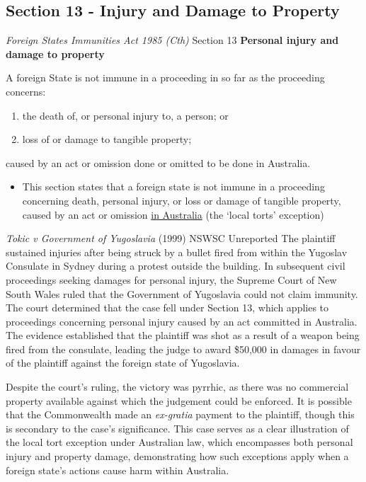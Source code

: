 \subsection{Section 13 - Injury and Damage to Property}
\begin{statutedetails}{\textit{Foreign States Immunities Act 1985 (Cth)} Section 13}
    \flushleft
    \textbf{Personal injury and damage to property}

    \vspace{\baselineskip}

    A foreign State is not immune in a proceeding in so far as the proceeding concerns:
    \begin{enumerate}[label=(\alph*)]
        \item the death of, or personal injury to, a person; or
        \item loss of or damage to tangible property;
    \end{enumerate}
    caused by an act or omission done or omitted to be done in Australia.
\end{statutedetails}

\begin{itemize}
    \item This section states that a foreign state is not immune in a proceeding concerning death, personal injury, or loss or damage of tangible property, caused by an act or omission \underline{in Australia} (the `local torts' exception)
\end{itemize}

\begin{casedetails}{\textit{Tokic v Government of Yugoslavia} (1999) NSWSC Unreported}
    \flushleft
    The plaintiff sustained injuries after being struck by a bullet fired from within the Yugoslav Consulate in Sydney during a protest outside the building. In subsequent civil proceedings seeking damages for personal injury, the Supreme Court of New South Wales ruled that the Government of Yugoslavia could not claim immunity. The court determined that the case fell under Section 13, which applies to proceedings concerning personal injury caused by an act committed in Australia. The evidence established that the plaintiff was shot as a result of a weapon being fired from the consulate, leading the judge to award \$50,000 in damages in favour of the plaintiff against the foreign state of Yugoslavia.

    \vspace{\baselineskip}
    
    Despite the court's ruling, the victory was pyrrhic, as there was no commercial property available against which the judgement could be enforced. It is possible that the Commonwealth made an \textit{ex-gratia} payment to the plaintiff, though this is secondary to the case's significance. This case serves as a clear illustration of the local tort exception under Australian law, which encompasses both personal injury and property damage, demonstrating how such exceptions apply when a foreign state's actions cause harm within Australia.
\end{casedetails}


